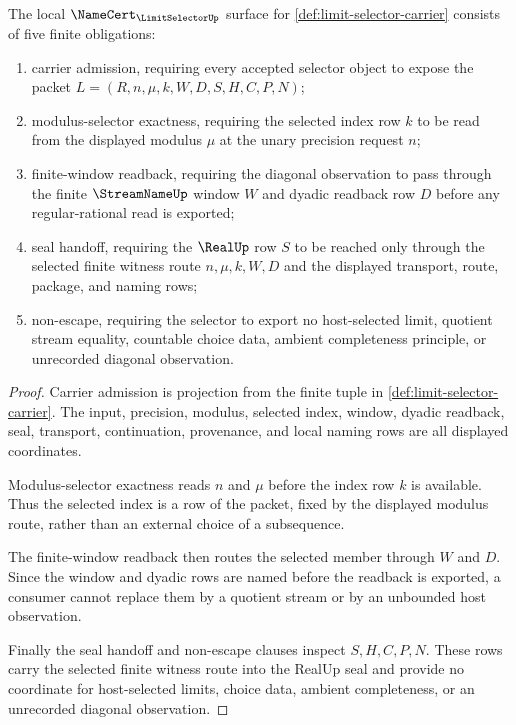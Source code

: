 \begin{theorem}
\label{thm:limit-selector-namecert-obligations}
The local $\NameCert_{\LimitSelectorUp}$ surface for \autoref{def:limit-selector-carrier} consists of five finite obligations:
\begin{enumerate}
\item carrier admission, requiring every accepted selector object to expose the packet $L=(R,n,\mu,k,W,D,S,H,C,P,N)$;
\item modulus-selector exactness, requiring the selected index row $k$ to be read from the displayed modulus $\mu$ at the unary precision request $n$;
\item finite-window readback, requiring the diagonal observation to pass through the finite $\StreamNameUp$ window $W$ and dyadic readback row $D$ before any regular-rational read is exported;
\item seal handoff, requiring the $\RealUp$ row $S$ to be reached only through the selected finite witness route $n,\mu,k,W,D$ and the displayed transport, route, package, and naming rows;
\item non-escape, requiring the selector to export no host-selected limit, quotient stream equality, countable choice data, ambient completeness principle, or unrecorded diagonal observation.
\end{enumerate}
\end{theorem}
\begin{proof}
Carrier admission is projection from the finite tuple in \autoref{def:limit-selector-carrier}. The input, precision, modulus, selected index, window, dyadic readback, seal, transport, continuation, provenance, and local naming rows are all displayed coordinates.

Modulus-selector exactness reads $n$ and $\mu$ before the index row $k$ is available. Thus the selected index is a row of the packet, fixed by the displayed modulus route, rather than an external choice of a subsequence.

The finite-window readback then routes the selected member through $W$ and $D$. Since the window and dyadic rows are named before the readback is exported, a consumer cannot replace them by a quotient stream or by an unbounded host observation.

Finally the seal handoff and non-escape clauses inspect $S,H,C,P,N$. These rows carry the selected finite witness route into the RealUp seal and provide no coordinate for host-selected limits, choice data, ambient completeness, or an unrecorded diagonal observation.
\end{proof}

